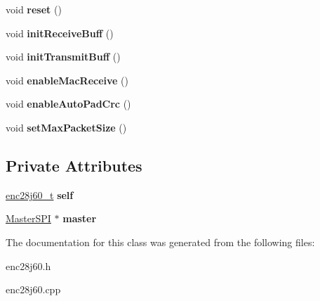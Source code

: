 \begin{DoxyCompactItemize}
void {\bfseries reset} ()
\item 
\mbox{\label{classEnc28j60_a7c5ee483693710bc8c973413e52dc5b9}} 
void {\bfseries init\+Receive\+Buff} ()
\item 
\mbox{\label{classEnc28j60_aea901773a26edf7e13a0aa249ef354d2}} 
void {\bfseries init\+Transmit\+Buff} ()
\item 
\mbox{\label{classEnc28j60_a801b7b936e24295f75a51ccce398c61c}} 
void {\bfseries enable\+Mac\+Receive} ()
\item 
\mbox{\label{classEnc28j60_a257b08a023955ade7d226e3c9a199780}} 
void {\bfseries enable\+Auto\+Pad\+Crc} ()
\item 
\mbox{\label{classEnc28j60_af4f9dbaf022b144ffea766c97630c902}} 
void {\bfseries set\+Max\+Packet\+Size} ()
\end{DoxyCompactItemize}
\subsection*{Private Attributes}
\begin{DoxyCompactItemize}
\item 
\mbox{\label{classEnc28j60_a397a8e8f650313321fad2ad320e52b9e}} 
\mbox{\hyperlink{structenc28j60__t}{enc28j60\+\_\+t}} {\bfseries self}
\item 
\mbox{\label{classEnc28j60_add18edc29b10e89bacc3e83ecd2b51fb}} 
\mbox{\hyperlink{classMasterSPI}{Master\+S\+PI}} $\ast$ {\bfseries master}
\end{DoxyCompactItemize}


The documentation for this class was generated from the following files\+:\begin{DoxyCompactItemize}
\item 
enc28j60.\+h\item 
enc28j60.\+cpp\end{DoxyCompactItemize}
